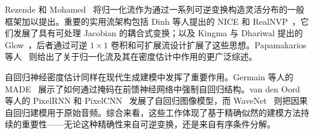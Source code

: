 \bigskip

Rezende 和 Mohamed~\cite{rezende2015variational} 将归一化流作为通过一系列可逆变换构造灵活分布的一般框架加以提出。重要的实用流架构包括 Dinh 等人提出的 NICE 和 RealNVP~\cite{dinh2014nice,dinh2017density}，它们发展了具有可处理 Jacobian 的耦合式变换；以及 Kingma 与 Dhariwal 提出的 Glow~\cite{kingma2018glow}，后者通过可逆 $1\times1$ 卷积和可扩展流设计扩展了这些思想。Papamakarios 等人~\cite{papamakarios2021normalizing} 则给出了关于归一化流及其在密度估计中作用的更广泛综述。

自回归神经密度估计同样在现代生成建模中发挥了重要作用。Germain 等人的 MADE~\cite{germain2015made} 展示了如何通过掩码在前馈神经网络中强制自回归结构。van den Oord 等人的 PixelRNN 和 PixelCNN~\cite{oord2016pixel} 发展了自回归图像模型，而 WaveNet~\cite{oord2016wavenet} 则把因果自回归建模用于原始音频。综合来看，这些工作体现了基于精确似然的建模方法持续的重要性——无论这种精确性来自可逆变换，还是来自有序条件分解。
